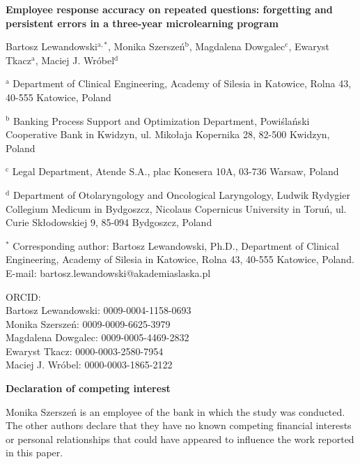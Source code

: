 \documentclass[11pt]{article}
\begin{document}
\begin{center}
{\Large\bfseries Employee response accuracy on repeated questions: forgetting and persistent errors in a three-year microlearning program\par}

\vspace{1.5em}
{\large Bartosz Lewandowski$^{\mathrm{a},*}$, Monika Szerszeń$^{\mathrm{b}}$, Magdalena Dowgalec$^{\mathrm{c}}$,
Ewaryst Tkacz$^{\mathrm{a}}$, Maciej J. Wróbel$^{\mathrm{d}}$\par}
\end{center}

\vspace{1em}
\noindent$^{\mathrm{a}}$ Department of Clinical Engineering, Academy of Silesia in Katowice, Rolna 43, 40-555 Katowice, Poland

\noindent$^{\mathrm{b}}$ Banking Process Support and Optimization Department, Powiślański Cooperative Bank in Kwidzyn, ul. Mikołaja Kopernika 28, 82-500 Kwidzyn, Poland

\noindent$^{\mathrm{c}}$ Legal Department, Atende S.A., plac Konesera 10A, 03-736 Warsaw, Poland

\noindent$^{\mathrm{d}}$ Department of Otolaryngology and Oncological Laryngology, Ludwik Rydygier Collegium Medicum in Bydgoszcz, Nicolaus Copernicus University in Toruń, ul. Curie Skłodowskiej 9, 85-094 Bydgoszcz, Poland

\vspace{1.5em}
\noindent$^{*}$ Corresponding author: Bartosz Lewandowski, Ph.D., Department of Clinical Engineering,
Academy of Silesia in Katowice, Rolna 43, 40-555 Katowice, Poland.\\
E-mail: bartosz.lewandowski@akademiaslaska.pl

\vspace{1.5em}
\noindent ORCID:\\
Bartosz Lewandowski: 0009-0004-1158-0693\\
Monika Szerszeń: 0009-0009-6625-3979\\
Magdalena Dowgalec: 0009-0005-4469-2832\\
Ewaryst Tkacz: 0000-0003-2580-7954\\
Maciej J. Wróbel: 0000-0003-1865-2122

\vspace{1.5em}
\noindent\textbf{Declaration of competing interest}\par
\noindent Monika Szerszeń is an employee of the bank in which the study was conducted. The other authors
declare that they have no known competing financial interests or personal relationships that could have
appeared to influence the work reported in this paper.
\end{document}
